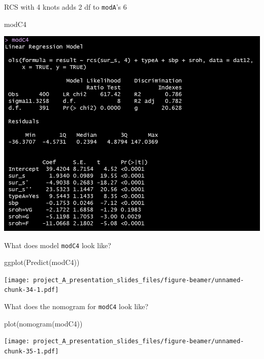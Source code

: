 \documentclass[
  ignorenonframetext,
]{beamer}
\newenvironment{Shaded}{\begin{snugshade}}{\end{snugshade}}
\newcommand{\FunctionTok}[1]{\textcolor[rgb]{0.00,0.00,0.00}{#1}}
\newcommand{\NormalTok}[1]{#1}
\begin{document}
\begin{frame}[fragile]{RCS with 4 knots adds 2 df to \texttt{modA}'s 6}
\protect\hypertarget{rcs-with-4-knots-adds-2-df-to-modas-6}{}
\begin{Shaded}
\begin{Highlighting}[]
\NormalTok{modC4}
\end{Highlighting}
\end{Shaded}

\begin{center}\includegraphics[width=12.58in,height=0.65\textheight]{figures/small5} \end{center}
\end{frame}

\begin{frame}[fragile]{What does model \texttt{modC4} look like?}
\protect\hypertarget{what-does-model-modc4-look-like}{}
\begin{Shaded}
\begin{Highlighting}[]
\FunctionTok{ggplot}\NormalTok{(}\FunctionTok{Predict}\NormalTok{(modC4))}
\end{Highlighting}
\end{Shaded}

\texttt{[image: project\_A\_presentation\_slides\_files/figure-beamer/unnamed-chunk-34-1.pdf]}
\end{frame}

\begin{frame}[fragile]{What does the nomogram for \texttt{modC4} look
like?}
\protect\hypertarget{what-does-the-nomogram-for-modc4-look-like}{}
\begin{Shaded}
\begin{Highlighting}[]
\FunctionTok{plot}\NormalTok{(}\FunctionTok{nomogram}\NormalTok{(modC4))}
\end{Highlighting}
\end{Shaded}

\texttt{[image: project\_A\_presentation\_slides\_files/figure-beamer/unnamed-chunk-35-1.pdf]}
\end{frame}
\end{document}
